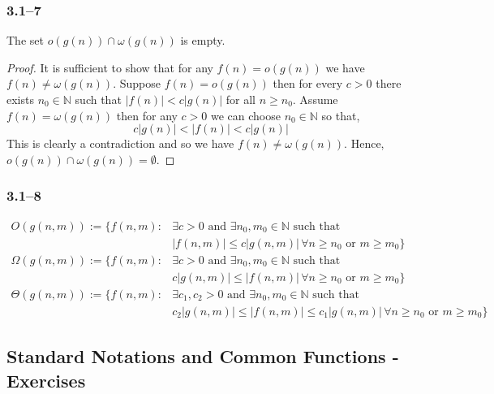 \subsubsection*{3.1--7}

\begin{proposition}
	\label{prop:little-intersection}
	The set $o(g(n))\cap\omega(g(n))$ is empty.
\end{proposition}

\begin{proof}
	It is sufficient to show that for any $f(n)=o(g(n))$ we have $f(n)\neq \omega(g(n))$. Suppose $f(n)=o(g(n))$ then for every $c>0$ there exists $n_{0}\in\mathbb{N}$ such that $\left|f(n)\right| < c\left|g(n)\right|$ for all $n\geq n_{0}$. Assume $f(n)=\omega(g(n))$ then for any $c>0$ we can choose $n_{0}\in\mathbb{N}$ so that,
	\begin{equation*}
		c\left|g(n)\right| < \left|f(n)\right| < c\left|g(n)\right|
	\end{equation*}
	This is clearly a contradiction and so we have $f(n)\neq \omega(g(n))$. Hence, $o(g(n))\cap\omega(g(n))=\emptyset$.
\end{proof}

\subsubsection*{3.1--8}

\begin{equation*}
	\begin{aligned}
		O(g(n,m)) := \{f(n,m)\colon&\exists c>0 \text{ and } \exists n_{0},m_{0}\in\mathbb{N} \text{ such that }\\
		&\left|f(n,m)\right| \leq c\left|g(n,m)\right|\,\forall n\geq n_{0}\text{ or }m\geq m_{0}\}\\
		\Omega(g(n,m)) := \{f(n,m)\colon&\exists c>0 \text{ and } \exists n_{0},m_{0}\in\mathbb{N} \text{ such that }\\
		&c\left|g(n,m)\right| \leq \left|f(n,m)\right|\,\forall n\geq n_{0}\text{ or }m\geq m_{0}\}\\
		\Theta(g(n,m)) := \{f(n,m)\colon&\exists c_{1},c_{2}>0 \text{ and } \exists n_{0},m_{0}\in\mathbb{N} \text{ such that }\\
		&c_{2}\left|g(n,m)\right|\leq\left|f(n,m)\right| \leq c_{1}\left|g(n,m)\right|\,\forall n\geq n_{0}\text{ or }m\geq m_{0}\}
	\end{aligned}
\end{equation*}

\subsection{Standard Notations and Common Functions - Exercises}

